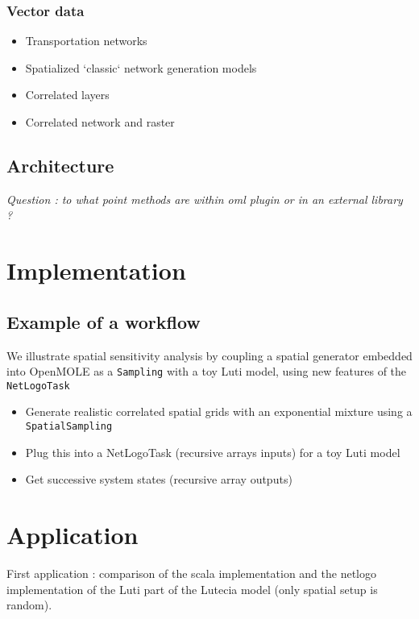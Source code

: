 \subsubsection{Vector data}

\begin{itemize}
	\item Transportation networks
	\item Spatialized `classic` network generation models
	\item Correlated layers	
	\item Correlated network and raster 
\end{itemize}




\subsection{Architecture}

\textit{Question : to what point methods are within oml plugin or in an external library ?}




\section{Implementation}


\subsection{Example of a workflow}

We illustrate spatial sensitivity analysis by coupling a spatial generator embedded into OpenMOLE as a \texttt{Sampling} with a toy Luti model, using new features of the \texttt{NetLogoTask}

\begin{itemize}
	\item Generate realistic correlated spatial grids with an exponential mixture using a \texttt{SpatialSampling}
	\item Plug this into a NetLogoTask (recursive arrays inputs) for a toy Luti model
	\item Get successive system states (recursive array outputs)
\end{itemize}


\section*{Application}

First application : comparison of the scala implementation and the netlogo implementation of the Luti part of the Lutecia model (only spatial setup is random).














